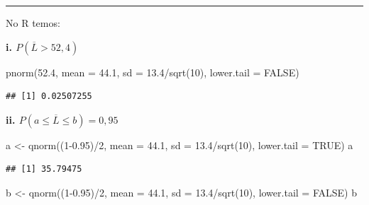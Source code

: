 \documentclass[
]{book}
\newenvironment{Shaded}{\begin{snugshade}}{\end{snugshade}}
\newcommand{\AttributeTok}[1]{\textcolor[rgb]{0.77,0.63,0.00}{#1}}
\newcommand{\ConstantTok}[1]{\textcolor[rgb]{0.00,0.00,0.00}{#1}}
\newcommand{\DecValTok}[1]{\textcolor[rgb]{0.00,0.00,0.81}{#1}}
\newcommand{\FloatTok}[1]{\textcolor[rgb]{0.00,0.00,0.81}{#1}}
\newcommand{\FunctionTok}[1]{\textcolor[rgb]{0.00,0.00,0.00}{#1}}
\newcommand{\NormalTok}[1]{#1}
\newcommand{\OtherTok}[1]{\textcolor[rgb]{0.56,0.35,0.01}{#1}}
\newcommand{\SpecialCharTok}[1]{\textcolor[rgb]{0.00,0.00,0.00}{#1}}
\begin{document}
\begin{center}\rule{0.5\linewidth}{0.5pt}\end{center}

No R temos:

\textbf{i. \(P(\overline{L} > 52,4)\)}

\begin{Shaded}
\begin{Highlighting}[]
\FunctionTok{pnorm}\NormalTok{(}\FloatTok{52.4}\NormalTok{, }
      \AttributeTok{mean =} \FloatTok{44.1}\NormalTok{, }
      \AttributeTok{sd =} \FloatTok{13.4}\SpecialCharTok{/}\FunctionTok{sqrt}\NormalTok{(}\DecValTok{10}\NormalTok{), }
      \AttributeTok{lower.tail =} \ConstantTok{FALSE}\NormalTok{)}
\end{Highlighting}
\end{Shaded}

\begin{verbatim}
## [1] 0.02507255
\end{verbatim}

\textbf{ii. \(P(a \le \overline{L} \le b) = 0,95\)}

\begin{Shaded}
\begin{Highlighting}[]
\NormalTok{a }\OtherTok{\textless{}{-}} \FunctionTok{qnorm}\NormalTok{((}\DecValTok{1}\FloatTok{{-}0.95}\NormalTok{)}\SpecialCharTok{/}\DecValTok{2}\NormalTok{, }
      \AttributeTok{mean =} \FloatTok{44.1}\NormalTok{, }
      \AttributeTok{sd =} \FloatTok{13.4}\SpecialCharTok{/}\FunctionTok{sqrt}\NormalTok{(}\DecValTok{10}\NormalTok{), }
      \AttributeTok{lower.tail =} \ConstantTok{TRUE}\NormalTok{)}
\NormalTok{a}
\end{Highlighting}
\end{Shaded}

\begin{verbatim}
## [1] 35.79475
\end{verbatim}

\begin{Shaded}
\begin{Highlighting}[]
\NormalTok{b }\OtherTok{\textless{}{-}} \FunctionTok{qnorm}\NormalTok{((}\DecValTok{1}\FloatTok{{-}0.95}\NormalTok{)}\SpecialCharTok{/}\DecValTok{2}\NormalTok{, }
      \AttributeTok{mean =} \FloatTok{44.1}\NormalTok{, }
      \AttributeTok{sd =} \FloatTok{13.4}\SpecialCharTok{/}\FunctionTok{sqrt}\NormalTok{(}\DecValTok{10}\NormalTok{), }
      \AttributeTok{lower.tail =} \ConstantTok{FALSE}\NormalTok{)}
\NormalTok{b}
\end{Highlighting}
\end{Shaded}
\end{document}
